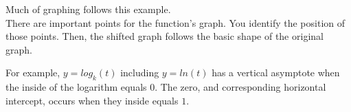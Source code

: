 \documentclass{ximera}
\begin{document}
\begin{example}
\begin{image}
\end{image}








\end{example}


Much of graphing follows this example.  \\


There are important points for the function's graph. You identify the position of those points.  Then, the shifted graph follows the basic shape of the original graph.






For example, $y = log_k(t)$ including $y = ln(t)$ has a vertical asymptote when the inside of the logarithm equals $0$. The zero, and corresponding horizontal intercept, occurs when they inside equals $1$.  
\end{document}
